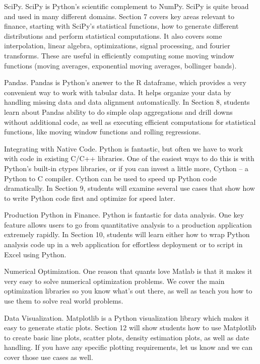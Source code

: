 SciPy.
SciPy is Python’s scientific complement to NumPy. SciPy is quite broad and used in many different domains. Section 7 covers key areas relevant to finance, starting with SciPy’s statistical functions, how to generate different distributions and perform statistical computations. It also covers some interpolation, linear algebra, optimizations, signal processing, and fourier transforms. These are useful in efficiently computing some moving window functions (moving averages, exponential moving averages, bollinger bands).


Pandas.
Pandas is Python’s answer to the R dataframe, which provides a very convenient way to work with tabular data. It helps organize your data by handling missing data and data alignment automatically. In Section 8, students learn about Pandas ability to do simple olap aggregations and drill downs without additional code, as well as executing efficient computations for statistical functions, like moving window functions and rolling regressions.


Integrating with Native Code.
Python is fantastic, but often we have to work with code in existing C/C++ libraries. One of the easiest ways to do this is with Python’s built-in ctypes libraries, or if you can invest a little more, Cython – a Python to C compiler. Cython can be used to speed up Python code dramatically. In Section 9, students will examine several use cases that show how to write Python code first and optimize for speed later.


Production Python in Finance.
Python is fantastic for data analysis. One key feature allows users to go from quantitative analysis to a production application extremely rapidly. In Section 10, students will learn either how to wrap Python analysis code up in a web application for effortless deployment or to script in Excel using Python.


Numerical Optimization. One reason that quants love Matlab is that it makes it very easy to solve numerical optimization problems. We cover the main optimization libraries so you know what’s out there, as well as teach you how to use them to solve real world problems.


Data Visualization.
Matplotlib is a Python visualization library which makes it easy to generate static plots. Section 12 will show students how to use Matplotlib to create basic line plots, scatter plots, density estimation plots, as well as date handling. If you have any specific plotting requirements, let us know and we can cover those use cases as well.
